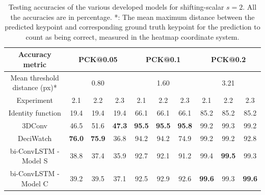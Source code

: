 \documentclass[./main.tex]{subfiles}
\begin{document}
\begin{table}[htbp]
    \begin{tabular}{c||ccc|ccc|ccc}
        \hline
        Accuracy metric & \multicolumn{3}{c}{PCK@0.05} & \multicolumn{3}{c}{PCK@0.1} & \multicolumn{3}{c}{PCK@0.2} \\
        \hline
        Mean threshold distance (px)* & \multicolumn{3}{c}{0.80} & \multicolumn{3}{c}{1.60} & \multicolumn{3}{c}{3.21} \\
        \hline
        Experiment & 2.1 & 2.2 & 2.3 & 2.1 & 2.2 & 2.3 & 2.1 & 2.2 & 2.3 \\
        \hline
        \hline
        Identity function & 19.4 & 19.4 & 19.4 & 66.1 & 66.1 & 66.1 & 85.2 & 85.2 & 85.2 \\
        3DConv & 46.5 & 51.6 & \textbf{47.3} & \textbf{95.5} & \textbf{95.5} & \textbf{95.8} & 99.2 & 99.3 & 99.2 \\
        DeciWatch & \textbf{76.0} & \textbf{75.9} & 36.8 & 94.2 & 94.2 & 74.9 & 99.2 & 99.2 & 92.8 \\
        bi-ConvLSTM - Model S & 38.8 & 37.4 & 35.9 & 92.7 & 92.1 & 91.2 & 99.4 & \textbf{99.5} & 99.3 \\
        bi-ConvLSTM - Model C & 39.2 & 39.5 & 37.1 & 92.5 & 92.9 & 92.6 & \textbf{99.6} & 99.3 & \textbf{99.6} \\
        \hline
    \end{tabular}
    \caption{Testing accuracies of the various developed models for shifting-scalar $s = 2$. All the accuracies are in percentage. *: The mean maximum distance between the predicted keypoint and corresponding ground truth keypoint for the prediction to count as being correct, measured in the heatmap coordinate system.}
    \label{tab:finetune_test_accs_2}
\end{table}
\end{document}
